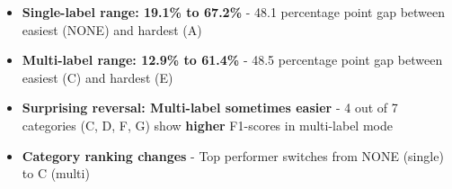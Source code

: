 \documentclass[12pt,a4paper]{article}
\begin{document}
\begin{itemize}[leftmargin=*]
    \item \textbf{Single-label range: 19.1\% to 67.2\%} - 48.1 percentage point gap between easiest (NONE) and hardest (A)
    
    \item \textbf{Multi-label range: 12.9\% to 61.4\%} - 48.5 percentage point gap between easiest (C) and hardest (E)
    
    \item \textbf{Surprising reversal: Multi-label sometimes easier} - 4 out of 7 categories (C, D, F, G) show \textbf{higher} F1-scores in multi-label mode
    
    \item \textbf{Category ranking changes} - Top performer switches from NONE (single) to C (multi)
\end{itemize}



    


    
\end{document}

